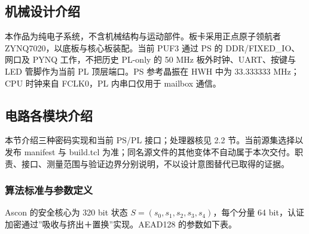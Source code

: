 
\Needspace{85pt}

\subsection{机械设计介绍}

本作品为纯电子系统，不含机械结构与运动部件。板卡采用正点原子领航者 ZYNQ7020，以底板与核心板装配。当前 PUF3 通过 PS 的 DDR/FIXED\_IO、网口及 PYNQ 工作，不把历史 PL-only 的 50 MHz 板外时钟、UART、按键与 LED 管脚作为当前 PL 顶层端口。PS 参考晶振在 HWH 中为 33.333333 MHz；CPU 时钟来自 FCLK0，PL 内串口仅用于 mailbox 通信。

\Needspace{85pt}

\subsection{电路各模块介绍}

本节介绍三种密码实现和当前 PS/PL 接口；处理器核见 2.2 节。当前源集选择以发布 manifest 与 build.tcl 为准；同名源文件的其他变体不自动属于本次交付。职责、接口、测量范围与验证边界分别说明，不以设计意图替代已取得的证据。

\Needspace{85pt}

\subsubsection{算法标准与参数定义}

Ascon 的安全核心为 320 bit 状态 \(S=(s_0,s_1,s_2,s_3,s_4)\)，每个分量 64 bit，认证加密通过''吸收与挤出＋置换''实现。AEAD128 的参数如下表。

